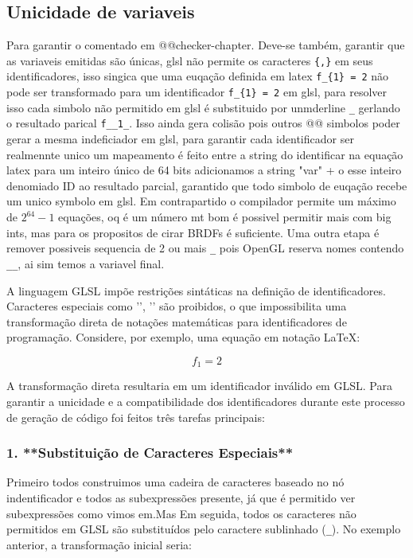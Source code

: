 \subsection{Unicidade de variaveis}

Para garantir o comentado em @@checker-chapter. Deve-se também, garantir que as variaveis emitidas são únicas, glsl não permite os caracteres \verb'{,}' em seus identificadores, isso singica que uma euqação definida em latex \verb`f_{1} = 2` não pode ser transformado para um identificador \verb`f_{1} = 2` em glsl, para resolver isso cada simbolo não permitido em glsl é substituido por unmderline \verb'_' gerlando o resultado parical \verb`f__1_`. Isso ainda gera colisão pois outros @@ simbolos poder gerar a mesma indeficiador em glsl, para garantir cada identificador ser realmennte unico um mapeamento é feito entre a string do identificar na equação latex para um inteiro único de 64 bits adicionamos a string "var" + o esse inteiro denomiado ID ao resultado parcial, garantido que todo simbolo de euqação recebe um unico symbolo em glsl. Em contrapartido o compilador permite um máximo de $2^64 - 1$ equações, oq é um número mt bom é possivel permitir mais com big ints, mas para os propositos de cirar BRDFs é suficiente. Uma outra etapa é remover possiveis sequencia de 2 ou mais \verb"_" pois OpenGL reserva nomes contendo \verb"__", ai sim temos a variavel final.

A linguagem GLSL impõe restrições sintáticas na definição de identificadores. Caracteres especiais como '{', '}' são proibidos, o que impossibilita uma transformação direta de notações matemáticas para identificadores de programação. Considere, por exemplo, uma equação em notação LaTeX:


\[ f_{1} = 2 \]

A transformação direta resultaria em um identificador inválido em GLSL.
Para garantir a unicidade e a compatibilidade dos identificadores durante este processo de geração de código foi feitos três tarefas principais:

\subsubsection{1. **Substituição de Caracteres Especiais**}
   
   Primeiro todos construimos uma cadeira de caracteres baseado no nó indentificador e todos as subexpressões presente, já que é permitido ver subexpressões como vimos em.Mas Em seguida, todos os caracteres não permitidos em GLSL são substituídos pelo caractere sublinhado (\verb'_'). No exemplo anterior, a transformação inicial seria:


